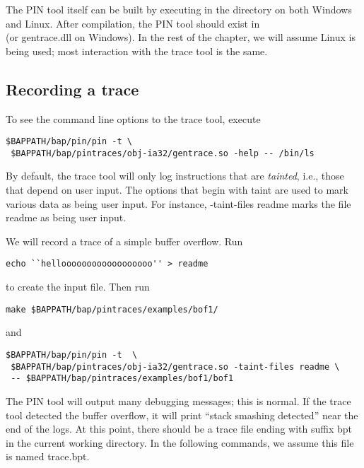The PIN tool itself can be built by executing  in the
 directory on both Windows and Linux.
After compilation, the PIN tool should exist in
\\  (or
gentrace.dll on Windows).  In the rest of the chapter, we will assume
Linux is being used; most interaction with the trace tool is the same.

\subsection{Recording a trace}

To see the command line options to the trace tool, execute 

\begin{verbatim} 
$BAPPATH/bap/pin/pin -t \
 $BAPPATH/bap/pintraces/obj-ia32/gentrace.so -help -- /bin/ls
\end{verbatim}

By default, the trace tool will only log instructions that are
\emph{tainted}, i.e., those that depend on user input.  The options
that begin with taint are used to mark various data
as being user input.  For instance, -taint-files readme marks the file
readme as being user input.

We will record a trace of a simple buffer overflow.  Run 

\begin{verbatim}
echo ``helloooooooooooooooooo'' > readme
\end{verbatim}

 to create the input file.  Then run 

\begin{verbatim}
make $BAPPATH/bap/pintraces/examples/bof1/
\end{verbatim}

and

\begin{verbatim}
$BAPPATH/bap/pin/pin -t  \
 $BAPPATH/bap/pintraces/obj-ia32/gentrace.so -taint-files readme \
 -- $BAPPATH/bap/pintraces/examples/bof1/bof1
\end{verbatim}

The PIN tool will output
many debugging messages; this is normal.  If the trace tool detected
the buffer overflow, it will print ``stack smashing detected'' near
the end of the logs.  At this point, there should be a trace file
ending with suffix bpt in the current working directory.  In the
following commands, we assume this file is named trace.bpt.

